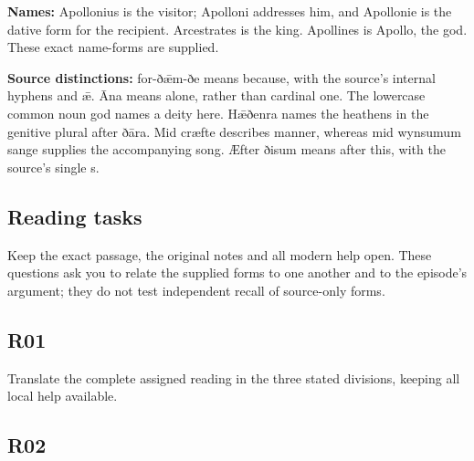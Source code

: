 \textbf{Names:} Apollonius is the visitor; Apolloni addresses him, and Apollonie is the dative form for the recipient. Arcestrates is the king. Apollines is Apollo, the god. These exact name-forms are supplied.

\textbf{Source distinctions:} for-ðǣm-ðe means because, with the source’s internal hyphens and ǣ. Āna means alone, rather than cardinal one. The lowercase common noun god names a deity here. Hǣðenra names the heathens in the genitive plural after ðāra. Mid cræfte describes manner, whereas mid wynsumum sange supplies the accompanying song. Æfter ðisum means after this, with the source’s single s.

\subsection*{Reading tasks}

Keep the exact passage, the original notes and all modern help open. These questions ask you to relate the supplied forms to one another and to the episode’s argument; they do not test independent recall of source-only forms.

\subsection*{R01}

Translate the complete assigned reading in the three stated divisions, keeping all local help available.




\subsection*{R02}

